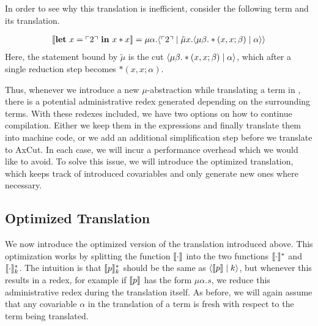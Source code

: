 In order to see why this translation is inefficient, consider the following term and its translation.
\begin{example}
  \label{ex:translation_naive}
  \begin{align*}
    \llbracket \mathbf{let}\ x = \ulcorner 2 \urcorner\ \mathbf{in}\ x*x \rrbracket = \mu\alpha.\langle \ulcorner 2 \urcorner \mid \tilde\mu x.\langle \mu\beta.*(x,x;\beta) \mid \alpha \rangle \rangle
  \end{align*}
  Here, the statement bound by $\tilde\mu$ is the cut $\langle \mu\beta.*(x,x;\beta) \mid \alpha \rangle$, which after a single reduction step becomes $*(x,x;\alpha)$.
\end{example}
Thus, whenever we introduce a new $\mu$-abstraction while translating a term in \surfacelang{}, there is a potential administrative redex generated  depending on the surrounding terms.
With these redexes included, we have two options on how to continue compilation. 
Either we keep them in the expressions and finally translate them into machine code, or we add an additional simplification step before we translate \targetlang{} to AxCut.
In each case, we will incur a performance overhead which we would like to avoid. 
To solve this issue, we will introduce the optimized translation, which keeps track of introduced covariables and only generate new ones where necessary.


\subsection{Optimized Translation}
\label{subsec:translation:optimized}
We now introduce the optimized version of the translation introduced above.
This optimization works by splitting the function $\llbracket \cdot \rrbracket$ into the two functions $\llbracket \cdot \rrbracket_{}^{\ast}$ and $\llbracket \cdot \rrbracket_{k}^{\ast}$.
The intuition is that $\llbracket p \rrbracket_{k}^{\ast}$ should be the same as $\langle \llbracket p \rrbracket \mid k \rangle$, but whenever this results in a redex, for example if $\llbracket p \rrbracket$ has the form $\mu \alpha.s$, we reduce this administrative redex during the translation itself.
As before, we will again assume that any covariable $\alpha$ in the translation of a term is fresh with respect to the term being translated.

